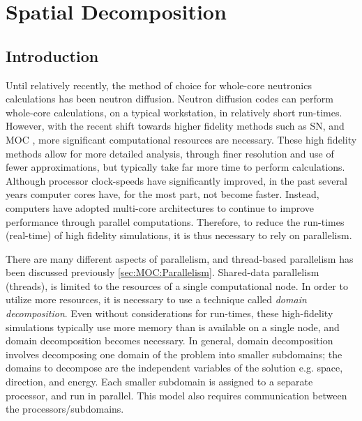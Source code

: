 \chapter{Spatial Decomposition}{\label{ch:Spatial Decomposition}
  \def\figpath{chapters/SpatialDecomposition/figures/}
  \graphicspath{ {\figpath} }
  \newcommand{\resultwidth}{0.85\linewidth}
  \section{Introduction}{\label{sec:Spatial Decomposition:Introduction}
    Until relatively recently, the method of choice for whole-core neutronics calculations has been neutron diffusion.
    Neutron diffusion codes can perform whole-core calculations, on a typical workstation, in relatively short run-times.
    However, with the recent shift towards higher fidelity methods such as \ac{SN}, and \ac{MOC} \cite{Askew1972}, more significant computational resources are necessary.
    These high fidelity methods allow for more detailed analysis, through finer resolution and use of fewer approximations, but typically take far more time to perform calculations.
    Although processor clock-speeds have significantly improved, in the past several years computer cores have, for the most part, not become faster.
    Instead, computers have adopted multi-core architectures to continue to improve performance through parallel computations.
    Therefore, to reduce the run-times (real-time) of high fidelity simulations, it is thus necessary to rely on parallelism.

    There are many different aspects of parallelism, and thread-based parallelism has been discussed previously \cref{sec:MOC:Parallelism}.
    Shared-data parallelism (threads), is limited to the resources of a single computational node.
    In order to utilize more resources, it is necessary to use a technique called \emph{domain decomposition}.
    Even without considerations for run-times, these high-fidelity simulations typically use more memory than is available on a single node, and domain decomposition becomes necessary.
    In general, domain decomposition involves decomposing one domain of the problem into smaller subdomains; the domains to decompose are the independent variables of the solution e.g. space, direction, and energy.
    Each smaller subdomain is assigned to a separate processor, and run in parallel.
    This model also requires communication between the processors/subdomains.

}}
